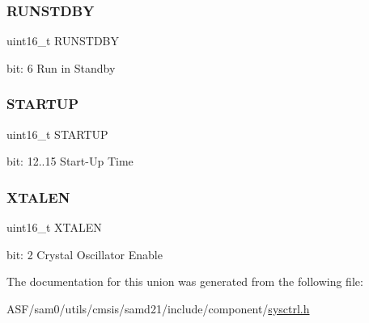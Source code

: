 \subsubsection{\texorpdfstring{RUNSTDBY}{RUNSTDBY}}
{\footnotesize\ttfamily uint16\+\_\+t R\+U\+N\+S\+T\+D\+BY}

bit\+: 6 Run in Standby \mbox{\label{union_s_y_s_c_t_r_l___x_o_s_c___type_a33b016c487940487fff564ff0940cd5a}} 
\subsubsection{\texorpdfstring{STARTUP}{STARTUP}}
{\footnotesize\ttfamily uint16\+\_\+t S\+T\+A\+R\+T\+UP}

bit\+: 12..15 Start-\/\+Up Time \mbox{\label{union_s_y_s_c_t_r_l___x_o_s_c___type_a213212644ef27e91b6ed7d8f995db6bf}} 
\subsubsection{\texorpdfstring{XTALEN}{XTALEN}}
{\footnotesize\ttfamily uint16\+\_\+t X\+T\+A\+L\+EN}

bit\+: 2 Crystal Oscillator Enable 

The documentation for this union was generated from the following file\+:\begin{DoxyCompactItemize}
\item 
A\+S\+F/sam0/utils/cmsis/samd21/include/component/\mbox{\hyperlink{component_2sysctrl_8h}{sysctrl.\+h}}\end{DoxyCompactItemize}
